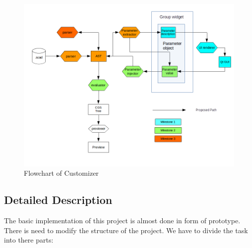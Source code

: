 \begin{figure}
    \centering \includegraphics[scale=0.65]{images/flowchart.png}
    \caption{Flowchart of Customizer}
    \label{fig:FD1}
\end{figure}

\subsection{Detailed Description}

The basic implementation of this project is almost done in form of prototype. There is need to modify the structure of the project. We have to divide the task into there parts:

